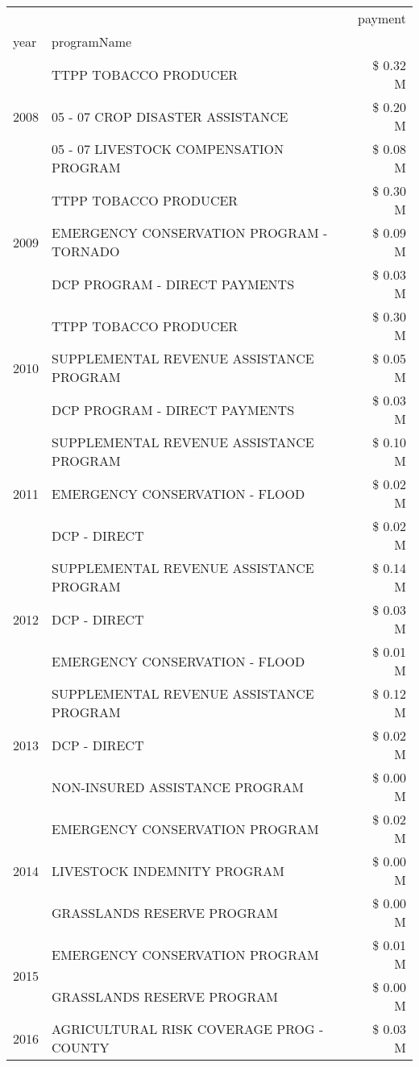 \begin{tabular}{llr}
\toprule
 &  & payment \\
year & programName &  \\
\midrule
\multirow[t]{3}{*}{2008} & TTPP TOBACCO PRODUCER & \$ 0.32 M \\
 & 05 - 07 CROP DISASTER ASSISTANCE & \$ 0.20 M \\
 & 05 - 07 LIVESTOCK COMPENSATION PROGRAM & \$ 0.08 M \\
\cline{1-3}
\multirow[t]{3}{*}{2009} & TTPP TOBACCO PRODUCER & \$ 0.30 M \\
 & EMERGENCY CONSERVATION PROGRAM - TORNADO & \$ 0.09 M \\
 & DCP PROGRAM - DIRECT PAYMENTS & \$ 0.03 M \\
\cline{1-3}
\multirow[t]{3}{*}{2010} & TTPP TOBACCO PRODUCER & \$ 0.30 M \\
 & SUPPLEMENTAL REVENUE ASSISTANCE PROGRAM & \$ 0.05 M \\
 & DCP PROGRAM - DIRECT PAYMENTS & \$ 0.03 M \\
\cline{1-3}
\multirow[t]{3}{*}{2011} & SUPPLEMENTAL REVENUE ASSISTANCE PROGRAM & \$ 0.10 M \\
 & EMERGENCY CONSERVATION - FLOOD & \$ 0.02 M \\
 & DCP - DIRECT & \$ 0.02 M \\
\cline{1-3}
\multirow[t]{3}{*}{2012} & SUPPLEMENTAL REVENUE ASSISTANCE PROGRAM & \$ 0.14 M \\
 & DCP - DIRECT & \$ 0.03 M \\
 & EMERGENCY CONSERVATION - FLOOD & \$ 0.01 M \\
\cline{1-3}
\multirow[t]{3}{*}{2013} & SUPPLEMENTAL REVENUE ASSISTANCE PROGRAM & \$ 0.12 M \\
 & DCP - DIRECT & \$ 0.02 M \\
 & NON-INSURED ASSISTANCE PROGRAM & \$ 0.00 M \\
\cline{1-3}
\multirow[t]{3}{*}{2014} & EMERGENCY CONSERVATION PROGRAM & \$ 0.02 M \\
 & LIVESTOCK INDEMNITY PROGRAM & \$ 0.00 M \\
 & GRASSLANDS RESERVE PROGRAM & \$ 0.00 M \\
\cline{1-3}
\multirow[t]{2}{*}{2015} & EMERGENCY CONSERVATION PROGRAM & \$ 0.01 M \\
 & GRASSLANDS RESERVE PROGRAM & \$ 0.00 M \\
\cline{1-3}
\multirow[t]{3}{*}{2016} & AGRICULTURAL RISK COVERAGE PROG - COUNTY & \$ 0.03 M \\

\end{tabular}
